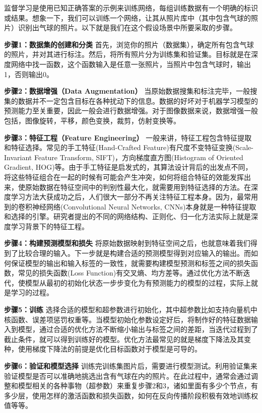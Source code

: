 ​
监督学习是使用已知正确答案的示例来训练网络，每组训练数据有一个明确的标识或结果。想象一下，我们可以训练一个网络，让其从照片库中（其中包含气球的照片）识别出气球的照片。以下就是我们在这个假设场景中所要采取的步骤。

\textbf{步骤1：数据集的创建和分类} ​
首先，浏览你的照片（数据集），确定所有包含气球的照片，并对其进行标注。然后，将所有照片分为训练集和验证集。目标就是在深度网络中找一函数，这个函数输入是任意一张照片，当照片中包含气球时，输出1，否则输出0。

\textbf{步骤2：数据增强（Data Augmentation）} ​
当原始数据搜集和标注完毕，一般搜集的数据并不一定包含目标在各种扰动下的信息。数据的好坏对于机器学习模型的预测能力至关重要，因此一般会进行数据增强。对于图像数据来说，数据增强一般包括，图像旋转，平移，颜色变换，裁剪，仿射变换等。

\textbf{步骤3：特征工程（Feature Engineering）} ​
一般来讲，特征工程包含特征提取和特征选择。常见的手工特征(Hand-Crafted
Feature)有尺度不变特征变换(Scale-Invariant Feature Transform,
SIFT)，方向梯度直方图(Histogram of Oriented Gradient,
HOG)等。由于手工特征是启发式的，其算法设计背后的出发点不同，将这些特征组合在一起的时候有可能会产生冲突，如何将组合特征的效能发挥出来，使原始数据在特征空间中的判别性最大化，就需要用到特征选择的方法。在深度学习方法大获成功之后，人们很大一部分不再关注特征工程本身。因为，最常用到的卷积神经网络(Convolutional
Neural Networks,
CNNs)本身就是一种特征提取和选择的引擎。研究者提出的不同的网络结构、正则化、归一化方法实际上就是深度学习背景下的特征工程。

\textbf{步骤4：构建预测模型和损失} ​
将原始数据映射到特征空间之后，也就意味着我们得到了比较合理的输入。下一步就是构建合适的预测模型得到对应输入的输出。而如何保证模型的输出和输入标签的一致性，就需要构建模型预测和标签之间的损失函数，常见的损失函数(Loss
Function)有交叉熵、均方差等。通过优化方法不断迭代，使模型从最初的初始化状态一步步变化为有预测能力的模型的过程，实际上就是学习的过程。

\textbf{步骤5：训练} ​
选择合适的模型和超参数进行初始化，其中超参数比如支持向量机中核函数、误差项惩罚权重等。当模型初始化参数设定好后，将制作好的特征数据输入到模型，通过合适的优化方法不断缩小输出与标签之间的差距，当迭代过程到了截止条件，就可以得到训练好的模型。优化方法最常见的就是梯度下降法及其变种，使用梯度下降法的前提是优化目标函数对于模型是可导的。

\textbf{步骤6：验证和模型选择} ​
训练完训练集图片后，需要进行模型测试。利用验证集来验证模型是否可以准确地挑选出含有气球在内的照片。
​
在此过程中，通常会通过调整和模型相关的各种事物（超参数）来重复步骤2和3，诸如里面有多少个节点，有多少层，使用怎样的激活函数和损失函数，如何在反向传播阶段积极有效地训练权值等等。

